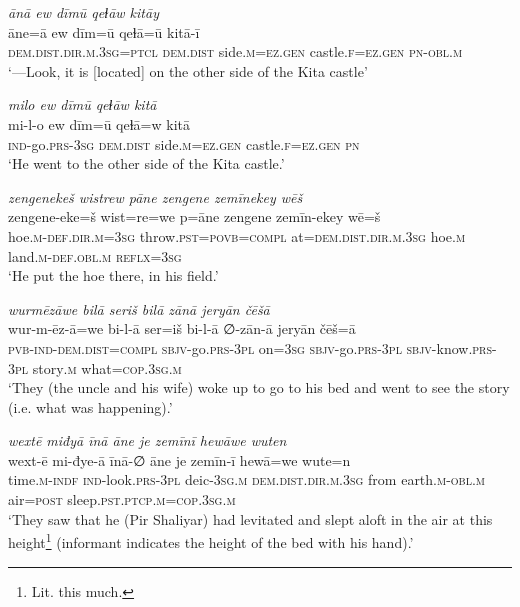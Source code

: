\ea \label{ŽP.19}
\textit{ānā ew dīmū qeɫāw kitāy} \\ 
\gll āne=ā ew dīm=ū qeɫā=ū kitā-ī \\ 
 \textsc{dem.dist}\textsc{.dir}\textsc{.m}\textsc{.3sg}=\textsc{ptcl} \textsc{dem.dist} side\textsc{.m}\textsc{\textsc{=ez.gen}} castle\textsc{.f}\textsc{\textsc{=ez.gen}} \textsc{pn}\textsc{-obl}\textsc{.m} \\ 
\glt `—Look, it is [located] on the other side of the Kita castle'
\z 
 
\ea \label{ŽP.31}
\textit{milo ew dīmū qeɫāw kitā} \\ 
\gll mi-l-o ew dīm=ū qeɫā=w kitā \\ 
 \textsc{ind-}go\textsc{.prs}\textsc{-3sg} \textsc{dem.dist} side\textsc{.m}\textsc{\textsc{=ez.gen}} castle\textsc{.f}\textsc{\textsc{=ez.gen}} \textsc{pn} \\ 
\glt `He went to the other side of the Kita castle.'
\z 
 
\ea \label{ŽP.52}
\textit{zengenekeš wistrew pāne zengene zemīnekey wēš} \\ 
\gll zengene-eke=š wist=re=we p=āne zengene zemīn-ekey wē=š \\ 
 hoe\textsc{.m}\textsc{-def}\textsc{.dir}\textsc{.m}\textsc{=3sg} throw\textsc{.pst}\textsc{=\textsc{povb}}\textsc{=compl} at=\textsc{dem.dist}\textsc{.dir}\textsc{.m}\textsc{.3sg} hoe\textsc{.m} land\textsc{.m}\textsc{-def}\textsc{.obl}\textsc{.m} \textsc{reflx}\textsc{=3sg} \\ 
\glt `He put the hoe there, in his field.'
\z 
 
\ea \label{ŽP.67}
\textit{wurmēzāwe bilā seriš bilā zānā jeryān čēšā} \\ 
\gll wur-m-ēz-ā=we bi-l-ā ser=iš bi-l-ā ∅-zān-ā jeryān čēš=ā \\ 
 \textsc{pvb-}\textsc{ind-}\textsc{dem.dist}\textsc{=compl} \textsc{sbjv-}go\textsc{.prs}\textsc{-3pl} on\textsc{=3sg} \textsc{sbjv-}go\textsc{.prs}\textsc{-3pl} \textsc{sbjv-}know\textsc{.prs}\textsc{-3pl} story\textsc{.m} what\textsc{=cop}\textsc{.3sg}\textsc{.m} \\ 
\glt `They (the uncle and his wife) woke up to go to his bed and went to see the story (i.e. what was happening).'
\z 
 
\ea \label{ŽP.68}
\textit{wextē miđyā īnā āne je zemīnī hewāwe wuten} \\ 
\gll wext-ē mi-đye-ā īnā-∅ āne je zemīn-ī hewā=we wute=n \\ 
 time\textsc{.m}\textsc{-indf} \textsc{ind-}look\textsc{.prs}\textsc{-3pl} deic\textsc{-3sg}\textsc{.m} \textsc{dem.dist}\textsc{.dir}\textsc{.m}\textsc{.3sg} from earth\textsc{.m}\textsc{-obl}\textsc{.m} air\textsc{=\textsc{post}} sleep\textsc{.pst}\textsc{.ptcp}\textsc{.m}\textsc{=cop}\textsc{.3sg}\textsc{.m} \\ 
\glt `They saw that he (Pir Shaliyar) had levitated and slept aloft in the air at this height\footnote{Lit. this much.} (informant indicates the height of the bed with his hand).'
\z 
 
